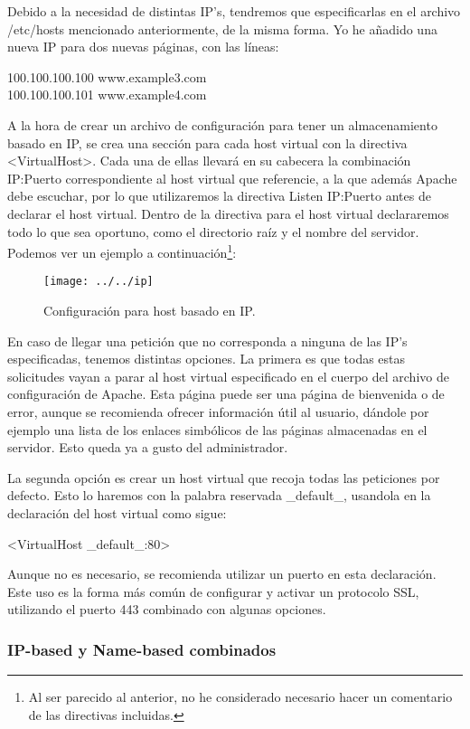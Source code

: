 \documentclass[a4paper, 10pt]{article} %
\begin{document}
Debido a la necesidad de distintas IP's, tendremos que especificarlas en el archivo /etc/hosts mencionado anteriormente, de la misma forma. Yo he añadido una nueva IP para dos nuevas páginas, con las líneas:

100.100.100.100 www.example3.com \\
100.100.100.101 www.example4.com

A la hora de crear un archivo de configuración para tener un almacenamiento basado en IP, se crea una sección para cada host virtual con la directiva <VirtualHost>. Cada una de ellas llevará en su cabecera la combinación IP:Puerto correspondiente al host virtual que referencie, a la que además Apache debe escuchar, por lo que utilizaremos la directiva Listen IP:Puerto antes de declarar el host virtual. Dentro de la directiva para el host virtual declararemos todo lo que sea oportuno, como el directorio raíz y el nombre del servidor. Podemos ver un ejemplo a continuación\footnote{Al ser parecido al anterior, no he considerado necesario hacer un comentario de las directivas incluidas.}: 


\begin{figure}[htpb]
\centering
\texttt{[image: ../../ip]}
\caption{Configuración para host basado en IP.}
\end{figure}

En caso de llegar una petición que no corresponda a ninguna de las IP's especificadas, tenemos distintas opciones. La primera es que todas estas solicitudes vayan a parar al host virtual especificado en el cuerpo del archivo de configuración de Apache. Esta página puede ser una página de bienvenida o de error, aunque se recomienda ofrecer información útil al usuario, dándole por ejemplo una lista de los enlaces simbólicos de las páginas almacenadas en el servidor. Esto queda ya a gusto del administrador. 

La segunda opción es crear un host virtual que recoja todas las peticiones por defecto. Esto lo haremos con la palabra reservada \_default\_, usandola en la declaración del host virtual como sigue: 

<VirtualHost \_default\_:80> 

Aunque no es necesario, se recomienda utilizar un puerto en esta declaración. Este uso es la forma más común de configurar y activar un protocolo SSL, utilizando el puerto 443 combinado con algunas opciones.  

\subsubsection{IP-based y Name-based combinados}
\end{document}
